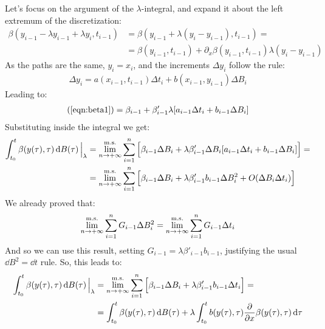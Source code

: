 \documentclass[../template.tex]{subfiles}
\begin{document}
\begin{exo}
    Let's focus on the argument of the $\lambda$-integral, and expand it about the left extremum of the discretization:
    \begin{align} \nonumber
        \beta(y_{i-1} - \lambda y_{i-1} + \lambda y_i, t_{i-1}) &= \beta(y_{i-1} + \lambda(y_i - y_{i-1}), t_{i-1}) =\\
        &= \beta(y_{i-1}, t_{i-1}) + \partial_x \beta(y_{i-1}, t_{i-1}) \lambda (y_i - y_{i-1}) \label{eqn:beta1}
    \end{align}
    As the paths are the same, $y_i = x_i$, and the increments $\Delta y_i$ follow the rule:
    \begin{align*}
        \Delta y_i = a(x_{i-1}, t_{i-1}) \Delta t_i + b(x_{i-1}, y_{i-1}) \Delta B_i
    \end{align*}
    Leading to:
    \begin{align*}
        (\ref{eqn:beta1}) = \beta_{i-1} + \beta_{i-1}' \lambda [a_{i-1}\Delta t_i + b_{i-1} \Delta B_i]
    \end{align*}
    Substituting inside the integral we get:
    \begin{align*}
        \int_{t_0}^t \beta(y(\tau), \tau) \dd{B(\tau)} \Big|_{\lambda} &= \overset{\rm m.s.}{\lim_{n \to +\infty}} \sum_{i=1}^{n} \Big[\beta_{i-1} \Delta B_i + \lambda \beta'_{i-1} \Delta B_i [a_{i-1} \Delta t_i + b_{i-1} \Delta B_{i}] \Big] =\\
        &=\overset{\rm m.s.}{\lim_{n \to +\infty}} \sum_{i=1}^{n}\Big[
        \beta_{i-1} \Delta B_i + \lambda \beta_{i-1}' b_{i-1} \Delta B_i^2 + O(\Delta B_i \Delta t_i)    
        \Big]
    \end{align*}
    We already proved that:
    \begin{align*}
        \overset{\rm m.s.}{\lim_{n \to +\infty}} \sum_{i=1}^n G_{i-1} \Delta B_i^2 = \overset{\rm m.s.}{\lim_{n \to +\infty}} \sum_{i=1}^n G_{i-1} \Delta t_i
    \end{align*}
    And so we can use this result, setting $G_{i-1} = \lambda \beta'_{i-1} b_{i-1}$, justifying the usual $\dd{B}^2 = \dd{t}$ rule. So, this leads to:
    \begin{align} \nonumber 
        \int_{t_0}^t \beta(y(\tau), \tau) \dd{B(\tau)} \Big|_{\lambda} &= \overset{\rm m.s.}{\lim_{n \to +\infty}} \sum_{i=1}^{n} \Big[\beta_{i-1} \Delta B_i + \lambda \beta_{i-1}' b_{i-1} \Delta t_i \Big] = \\
        &=\int_{t_0}^t \beta(y(\tau), \tau) \dd{B(\tau)} + \lambda \int_{t_0}^t b(y(\tau), \tau) \pdv{x} \beta(y(\tau), \tau) \dd{\tau}
        \label{eqn:formula}

\end{align}
\end{exo}
\end{document}
